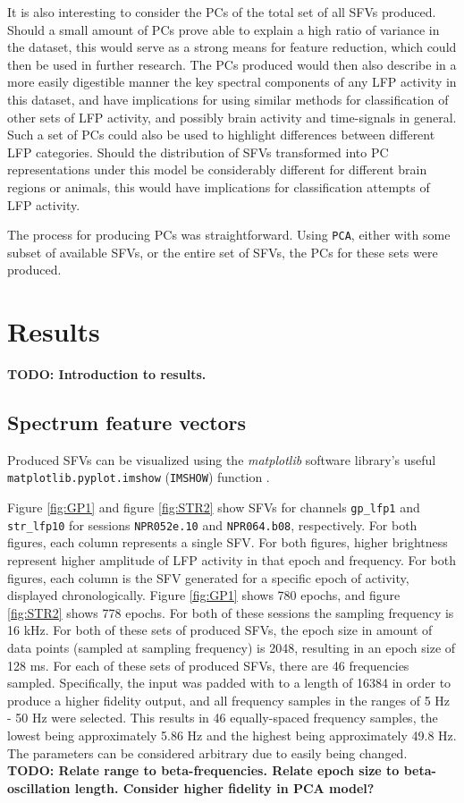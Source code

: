 \documentclass{article}
\begin{document}
It is also interesting to consider the PCs of the total set of all SFVs produced. 
Should a small amount of PCs prove able to explain a high ratio of variance in the dataset, this would serve as a strong means for feature reduction, which could then be used in further research.
The PCs produced would then also describe in a more easily digestible manner the key spectral components of any LFP activity in this dataset, and have implications for using similar methods for classification of other sets of LFP activity, and possibly brain activity and time-signals in general.
Such a set of PCs could also be used to highlight differences between different LFP categories.
Should the distribution of SFVs transformed into PC representations under this model be considerably different for different brain regions or animals, this would have implications for classification attempts of LFP activity.

The process for producing PCs was straightforward.
Using \texttt{PCA}, either with some subset of available SFVs, or the entire set of SFVs, the PCs for these sets were produced.

\newpage
\section{Results}

\textbf{TODO: Introduction to results.}

\subsection{Spectrum feature vectors}
Produced SFVs can be visualized using the \textit{matplotlib} software library's useful \texttt{matplotlib.pyplot.imshow} (\texttt{IMSHOW}) function \citep{MPL}.

Figure \ref{fig:GP1} and figure \ref{fig:STR2} show SFVs for channels \texttt{gp\_lfp1} and \texttt{str\_lfp10} for sessions \texttt{NPR052e.10} and \texttt{NPR064.b08}, respectively. 
For both figures, each column represents a single SFV. 
For both figures, higher brightness represent higher amplitude of LFP activity in that epoch and frequency.
For both figures, each column is the SFV generated for a specific epoch of activity, displayed chronologically. 
Figure \ref{fig:GP1} shows 780 epochs, and figure \ref{fig:STR2} shows 778 epochs. 
For both of these sessions the sampling frequency is 16 kHz. 
For both of these sets of produced SFVs, the epoch size in amount of data points (sampled at sampling frequency) is 2048, resulting in an epoch size of 128 ms. 
For each of these sets of produced SFVs, there are 46 frequencies sampled. 
Specifically, the input was padded with to a length of 16384 in order to produce a higher fidelity output, and all frequency samples in the ranges of 5 Hz - 50 Hz were selected. 
This results in 46 equally-spaced frequency samples, the lowest being approximately 5.86 Hz and the highest being approximately 49.8 Hz. 
The parameters can be considered arbitrary due to easily being changed.
\textbf{TODO: Relate range to beta-frequencies. Relate epoch size to beta-oscillation length. Consider higher fidelity in PCA model?} 
\end{document}

